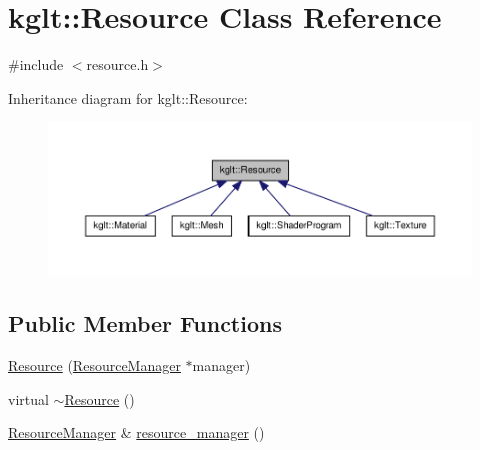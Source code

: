 \hypertarget{classkglt_1_1_resource}{\section{kglt\-:\-:Resource Class Reference}
\label{classkglt_1_1_resource}
}


{\ttfamily \#include $<$resource.\-h$>$}



Inheritance diagram for kglt\-:\-:Resource\-:\nopagebreak
\begin{figure}[H]
\begin{center}
\leavevmode
\includegraphics[width=350pt]{classkglt_1_1_resource__inherit__graph}
\end{center}
\end{figure}
\subsection*{Public Member Functions}
\begin{DoxyCompactItemize}
\item 
\hyperlink{classkglt_1_1_resource_a773b715514230b08920c25bd8b402ea4}{Resource} (\hyperlink{classkglt_1_1_resource_manager}{Resource\-Manager} $\ast$manager)
\item 
virtual \hyperlink{classkglt_1_1_resource_a06a21d5db28169c076ab93dd8c4d5526}{$\sim$\-Resource} ()
\item 
\hyperlink{classkglt_1_1_resource_manager}{Resource\-Manager} \& \hyperlink{classkglt_1_1_resource_a966a14c55828b2adc52aad0fac828205}{resource\-\_\-manager} ()
\end{DoxyCompactItemize}


